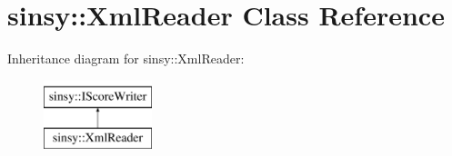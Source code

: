 \hypertarget{classsinsy_1_1XmlReader}{\section{sinsy\-:\-:\-Xml\-Reader \-Class \-Reference}
\label{classsinsy_1_1XmlReader}
}
\-Inheritance diagram for sinsy\-:\-:\-Xml\-Reader\-:\begin{figure}[H]
\begin{center}
\leavevmode
\includegraphics[height=2.000000cm]{classsinsy_1_1XmlReader}
\end{center}
\end{figure}
